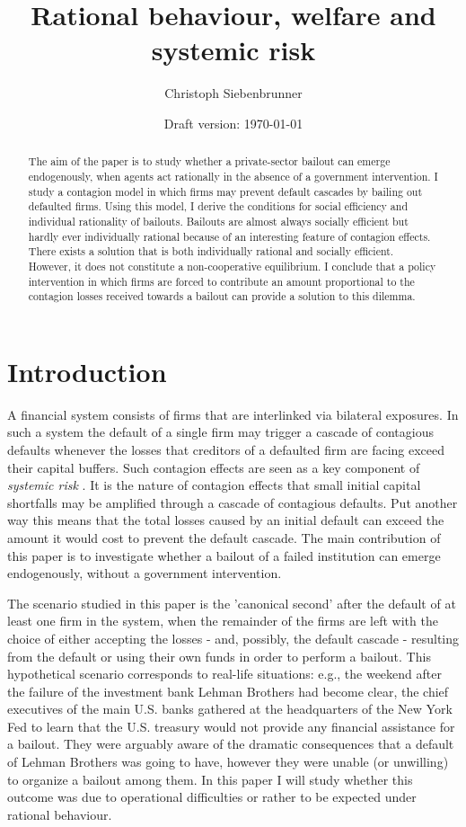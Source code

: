\documentclass[12pt,a4paper]{article}
\date{Draft version: \today}
\title{Rational behaviour, welfare and systemic risk}
\author{Christoph Siebenbrunner}
\begin{document}
\maketitle

\begin{abstract}
The aim of the paper is to study whether a private-sector bailout can emerge endogenously, when agents act rationally in the absence of a government intervention. I study a contagion model in which firms may prevent default cascades by bailing out defaulted firms. Using this model, I derive the conditions for social efficiency and individual rationality of bailouts. Bailouts are almost always socially efficient but hardly ever individually rational because of an interesting feature of contagion effects. There exists a solution that is both individually rational and socially efficient. However, it does not constitute a non-cooperative equilibrium. I conclude that a policy intervention in which firms are forced to contribute an amount proportional to the contagion losses received towards a bailout can provide a solution to this dilemma.
\end{abstract}

\section{Introduction}
A financial system consists of firms that are interlinked via bilateral exposures. In such a system the default of a single firm may trigger a cascade of contagious defaults whenever the losses that creditors of a defaulted firm are facing exceed their capital buffers. Such contagion effects are seen as a key component of \textit{systemic risk} \cite[pp. 134-142]{ECB09}. It is the nature of contagion effects that small initial capital shortfalls may be amplified through a cascade of contagious defaults. Put another way this means that the total losses caused by an initial default can exceed the amount it would cost to prevent the default cascade. The main contribution of this paper is to investigate whether a bailout of a failed institution can emerge endogenously, without a government intervention.

The scenario studied in this paper is the 'canonical second' after the default of at least one firm in the system, when the remainder of the firms are left with the choice of either accepting the losses - and, possibly, the default cascade - resulting from the default or using their own funds in order to perform a bailout. This hypothetical scenario corresponds to real-life situations: e.g., the weekend after the failure of the investment bank Lehman Brothers had become clear, the chief executives of the main U.S. banks gathered at the headquarters of the New York Fed to learn that the U.S. treasury would not provide any financial assistance for a bailout. They were arguably aware of the dramatic consequences that a default of Lehman Brothers was going to have, however they were unable (or unwilling) to organize a bailout among them. In this paper I will study whether this outcome was due to operational difficulties or rather to be expected under rational behaviour.
\end{document}
